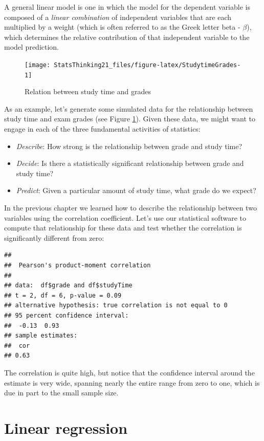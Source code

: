 \documentclass[12pt,]{book}
\providecommand{\tightlist}{%
  \setlength{\itemsep}{0pt}\setlength{\parskip}{0pt}}
\theoremstyle{definition}
\theoremstyle{definition}
\theoremstyle{definition}
\theoremstyle{remark}
\begin{document}
A general linear model is one in which the model for the dependent variable is composed of a \emph{linear combination} of independent variables that are each multiplied by a weight (which is often referred to as the Greek letter beta - \(\beta\)), which determines the relative contribution of that independent variable to the model prediction.

\begin{figure}
\texttt{[image: StatsThinking21\_files/figure-latex/StudytimeGrades-1]} \caption{Relation between study time and grades}\label{fig:StudytimeGrades}
\end{figure}

As an example, let's generate some simulated data for the relationship between study time and exam grades (see Figure \ref{fig:StudytimeGrades}). Given these data, we might want to engage in each of the three fundamental activities of statistics:

\begin{itemize}
\tightlist
\item
  \emph{Describe}: How strong is the relationship between grade and study time?
\item
  \emph{Decide}: Is there a statistically significant relationship between grade and study time?
\item
  \emph{Predict}: Given a particular amount of study time, what grade do we expect?
\end{itemize}

In the previous chapter we learned how to describe the relationship between two variables using the correlation coefficient. Let's use our statistical software to compute that relationship for these data and test whether the correlation is significantly different from zero:

\begin{verbatim}
## 
##  Pearson's product-moment correlation
## 
## data:  df$grade and df$studyTime
## t = 2, df = 6, p-value = 0.09
## alternative hypothesis: true correlation is not equal to 0
## 95 percent confidence interval:
##  -0.13  0.93
## sample estimates:
##  cor 
## 0.63
\end{verbatim}

The correlation is quite high, but notice that the confidence interval around the estimate is very wide, spanning nearly the entire range from zero to one, which is due in part to the small sample size.

\hypertarget{linear-regression}{%
\section{Linear regression}\label{linear-regression}}
\end{document}
